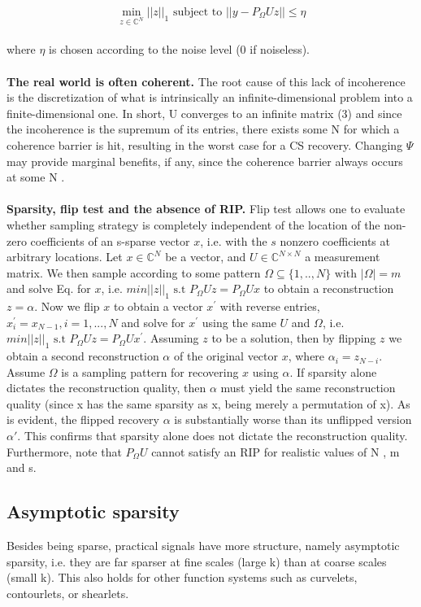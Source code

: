 \documentclass{article}
\begin{document}
\begin{equation}%
    \min_{z \in \mathbb{C}^N}||z||_1 \text{ subject to } ||y-P_{\Omega}Uz|| \leq \eta
\end{equation}
\\
where $\eta$ is chosen according to the noise level (0 if noiseless). \\
\\
\textbf{The real world is often coherent.} The root cause of this lack of incoherence is the discretization of what is intrinsically an infinite-dimensional problem into a finite-dimensional one. In short, U converges to an infinite matrix (3) and since the incoherence is the supremum of its entries, there exists some N for which a coherence barrier is hit, resulting in the worst case for a CS recovery. Changing $\Psi$ may provide marginal benefits, if any, since the coherence barrier always occurs at some N .\\
\\
\textbf{Sparsity, flip test and the absence of RIP.} Flip test allows one to evaluate whether sampling strategy is completely independent of the location of the non-zero coefficients of an s-sparse vector $x$, i.e. with the $s$ nonzero coefficients at arbitrary locations. Let $x \in \mathbb{C}^N$ be a vector, and $U \in \mathbb{C}^{N\times N}$ a measurement matrix. We then sample according to some pattern $\Omega \subseteq \{1,..,N\} \text{ with } |\Omega|= m$ and solve Eq. for $x$, i.e. $min||z||_1 \text{ s.t } P_{\Omega} Uz=P_{\Omega}Ux$ to obtain a reconstruction $z= \alpha.$ Now we flip $x$ to obtain a vector $x^{'}$ with reverse entries, $x^{'}_{i} = x_{N-1}, i= 1,...,N$ and solve for $x^{'}$ using the same $U$ and $\Omega$, i.e. $min||z||_1 \text{ s.t } P_{\Omega} Uz=P_{\Omega}Ux^{'}$.  Assuming $z$ to be a solution, then by flipping $z$ we obtain a second reconstruction $\alpha$ of the original vector $x$, where $\alpha_i = z_{N-i}$.
\\
Assume $\Omega$ is a sampling pattern for recovering $x$ using $\alpha$. If sparsity alone dictates the reconstruction quality, then $\alpha$ must yield the same reconstruction quality (since x has the same sparsity as x, being merely a permutation of x). As is evident, the flipped recovery $\alpha$ is substantially worse than its unflipped version $\alpha'$. This confirms that sparsity alone does not dictate
the reconstruction quality. Furthermore, note that $ P_{\Omega} U$ cannot satisfy an RIP for realistic values of N , m and s. 

\subsection{Asymptotic sparsity}
Besides being sparse, practical  signals have more structure, namely asymptotic sparsity, i.e. they are far sparser at fine scales (large  k) than at coarse scales (small k). This also holds for other function  systems such as curvelets, contourlets, or shearlets.
\end{document}
